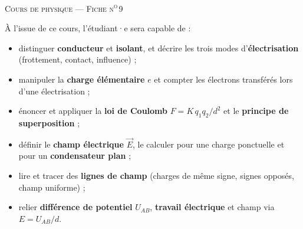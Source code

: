 \documentclass[11pt,a4paper]{article}
\newcommand{\vc}[1]{\vec{#1}}
\begin{document}
\sloppy

\begingroup
\thispagestyle{empty}
\centering
\vspace*{1.2cm}


\vspace{0.4cm}
{\large\color{primarydark}\textsc{Cours de physique — Fiche n\textsuperscript{o}\,9}}

\vspace{0.7cm}


\vfill

\begin{tcolorbox}[boxbase,colback=primary!5,colframe=primary,width=15cm,
    title={\textsc{Objectifs pédagogiques de la fiche}}]
À l'issue de ce cours, l'étudiant·e sera capable de :
\begin{itemize}[leftmargin=1.6em,topsep=2pt,itemsep=1pt]
  \item distinguer \textbf{conducteur} et \textbf{isolant}, et décrire les trois modes
        d'\textbf{électrisation} (frottement, contact, influence) ;
  \item manipuler la \textbf{charge élémentaire} $e$ et compter les électrons transférés lors
        d'une électrisation ;
  \item énoncer et appliquer la \textbf{loi de Coulomb} $F = K\,q_1 q_2/d^2$ et le
        \textbf{principe de superposition} ;
  \item définir le \textbf{champ électrique} $\vc{E}$, le calculer pour une charge ponctuelle
        et pour un \textbf{condensateur plan} ;
  \item lire et tracer des \textbf{lignes de champ} (charges de même signe, signes opposés,
        champ uniforme) ;
  \item relier \textbf{différence de potentiel} $U_{AB}$, \textbf{travail électrique} et champ
        via $E = U_{AB}/d$.
\end{itemize}
\end{tcolorbox}
\end{document}

